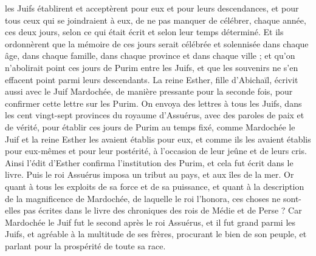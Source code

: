 \begin{multicols}{2}
les Juifs établirent et acceptèrent pour eux et pour leurs descendances, et pour tous ceux qui se joindraient à eux, de ne pas manquer de célébrer, chaque année, ces deux jours, selon ce qui était écrit et selon leur temps déterminé.
Et ils ordonnèrent que la mémoire de ces jours serait célébrée et solennisée dans chaque âge, dans chaque famille, dans chaque province et dans chaque ville ; et qu’on n’abolirait point ces jours de Purim entre les Juifs, et que les souvenirs ne s'en effacent point parmi leurs descendants.
La reine Esther, fille d'Abichaïl, écrivit aussi avec le Juif Mardochée, de manière pressante pour la seconde fois, pour confirmer cette lettre sur les Purim.
On envoya des lettres à tous les Juifs, dans les cent vingt-sept provinces du royaume d'Assuérus, avec des paroles de paix et de vérité,
pour établir ces jours de Purim au temps fixé, comme Mardochée le Juif et la reine Esther les avaient établis pour eux, et comme ils les avaient établis pour eux-mêmes et pour leur postérité, à l’occasion de leur jeûne et de leurs cris.
Ainsi l'édit d'Esther confirma l’institution des Purim, et cela fut écrit dans le livre.
\VerseOne{}Puis le roi Assuérus imposa un tribut au pays, et aux îles de la mer.
Or quant à tous les exploits de sa force et de sa puissance, et quant à la description de la magnificence de Mardochée, de laquelle le roi l’honora, ces choses ne sont-elles pas écrites dans le livre des chroniques des rois de Médie et de Perse ?
Car Mardochée le Juif fut le second après le roi Assuérus, et il fut grand parmi les Juifs, et agréable à la multitude de ses frères, procurant le bien de son peuple, et parlant pour la prospérité de toute sa race.
\PPE{}
\end{multicols}

